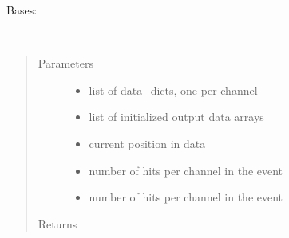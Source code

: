 \documentclass[letterpaper,10pt,english]{sphinxmanual}
\begin{document}
\begin{fulllineitems}
\label{\detokenize{autodocs/data:listmode.data.BitProcessor}}
\sphinxAtStartPar
Bases: {\hyperref[\detokenize{autodocs/data:listmode.data.ColProcessor}]{}}

\begin{fulllineitems}
\label{\detokenize{autodocs/data:listmode.data.BitProcessor.process}}~\begin{quote}\begin{description}
\item[{Parameters}] \leavevmode\begin{itemize}
\item {} 
\sphinxAtStartPar
{} \textendash{} list of data\_dicts, one per channel

\item {} 
\sphinxAtStartPar
{} \textendash{} list of initialized output data arrays

\item {} 
\sphinxAtStartPar
{} \textendash{} current position in data

\item {} 
\sphinxAtStartPar
{} \textendash{} number of hits per channel in the event

\item {} 
\sphinxAtStartPar
{} \textendash{} number of hits per channel in the event

\end{itemize}

\item[{Returns}] \leavevmode
\sphinxAtStartPar


\end{description}\end{quote}

\end{fulllineitems}


\end{fulllineitems}
\end{document}
